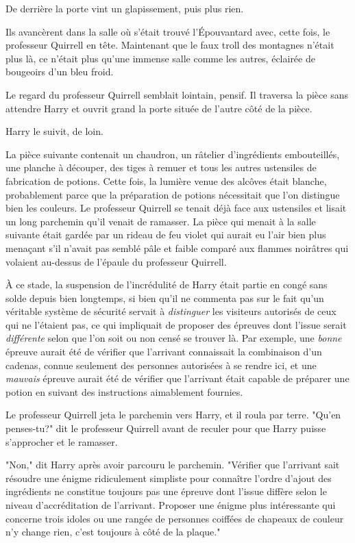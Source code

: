 De derrière la porte vint un glapissement, puis plus rien.

Ils avancèrent dans la salle où s'était trouvé l'Épouvantard avec, cette fois, le professeur Quirrell en tête. Maintenant que le faux troll des montagnes n'était plus là, ce n'était plus qu'une immense salle comme les autres, éclairée de bougeoirs d'un bleu froid.

Le regard du professeur Quirrell semblait lointain, pensif. Il traversa la pièce sans attendre Harry et ouvrit grand la porte située de l'autre côté de la pièce.

Harry le suivit, de loin.

\later

La pièce suivante contenait un chaudron, un râtelier d'ingrédients embouteillés, une planche à découper, des tiges à remuer et tous les autres ustensiles de fabrication de potions. Cette fois, la lumière venue des alcôves était blanche, probablement parce que la préparation de potions nécessitait que l'on distingue bien les couleurs. Le professeur Quirrell se tenait déjà face aux ustensiles et lisait un long parchemin qu'il venait de ramasser. La pièce qui menait à la salle suivante était gardée par un rideau de feu violet qui aurait eu l'air bien plus menaçant s'il n'avait pas semblé pâle et faible comparé aux flammes noirâtres qui volaient au-dessus de l'épaule du professeur Quirrell.

À ce stade, la suspension de l'incrédulité de Harry était partie en congé sans solde depuis bien longtemps, si bien qu'il ne commenta pas sur le fait qu'un véritable système de sécurité servait à \emph{distinguer} les visiteurs autorisés de ceux qui ne l'étaient pas, ce qui impliquait de proposer des épreuves dont l'issue serait \emph{différente} selon que l'on soit ou non censé se trouver là. Par exemple, une \emph{bonne} épreuve aurait été de vérifier que l'arrivant connaissait la combinaison d'un cadenas, connue seulement des personnes autorisées à se rendre ici, et une \emph{mauvais} épreuve aurait été de vérifier que l'arrivant était capable de préparer une potion en suivant des instructions aimablement fournies.

Le professeur Quirrell jeta le parchemin vers Harry, et il roula par terre. "Qu'en penses-tu?" dit le professeur Quirrell avant de reculer pour que Harry puisse s'approcher et le ramasser.

"Non," dit Harry après avoir parcouru le parchemin. "Vérifier que l'arrivant sait résoudre une énigme ridiculement simpliste pour connaître l'ordre d'ajout des ingrédients ne constitue toujours pas une épreuve dont l'issue diffère selon le niveau d'accréditation de l'arrivant. Proposer une énigme plus intéressante qui concerne trois idoles ou une rangée de personnes coiffées de chapeaux de couleur n'y change rien, c'est toujours à côté de la plaque."

